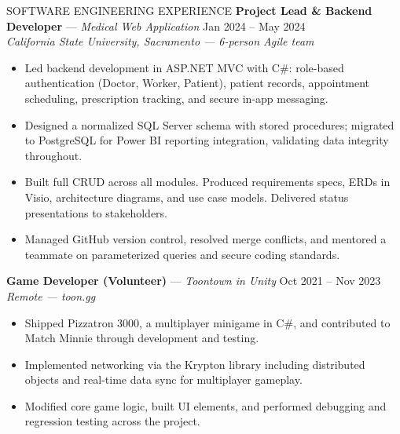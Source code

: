 \documentclass{resume}
\begin{document}
\begin{rSection}{SOFTWARE ENGINEERING EXPERIENCE}
\textbf{Project Lead \& Backend Developer} --- \textit{Medical Web Application} \hfill Jan 2024 -- May 2024 \\
\textit{California State University, Sacramento --- 6-person Agile team}
\begin{itemize}
    \item Led backend development in ASP.NET MVC with C\#: role-based authentication (Doctor, Worker, Patient), patient records, appointment scheduling, prescription tracking, and secure in-app messaging.
    \item Designed a normalized SQL Server schema with stored procedures; migrated to PostgreSQL for Power BI reporting integration, validating data integrity throughout.
    \item Built full CRUD across all modules. Produced requirements specs, ERDs in Visio, architecture diagrams, and use case models. Delivered status presentations to stakeholders.
    \item Managed GitHub version control, resolved merge conflicts, and mentored a teammate on parameterized queries and secure coding standards.
\end{itemize}

\textbf{Game Developer (Volunteer)} --- \textit{Toontown in Unity} \hfill Oct 2021 -- Nov 2023 \\
\textit{Remote --- toon.gg}
\begin{itemize}
    \item Shipped Pizzatron 3000, a multiplayer minigame in C\#, and contributed to Match Minnie through development and testing.
    \item Implemented networking via the Krypton library including distributed objects and real-time data sync for multiplayer gameplay.
    \item Modified core game logic, built UI elements, and performed debugging and regression testing across the project.
\end{itemize}

\end{rSection}

\end{document}
